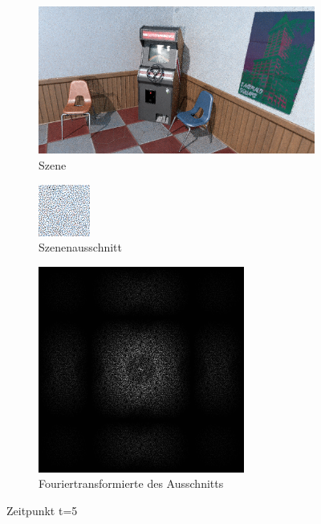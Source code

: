 \begin{figure}[H]
    \begin{subfigure}{\textwidth}   
        \centering \includegraphics[scale=.25]{content/TemporalerAlg/Bilder/Retargeting/Screenshots/seed_debug_7.0_selection.png}
        \caption{Szene}
        \label{fig:Retargeting_And_Sorting_Szene_t5}
    \end{subfigure}
    \begin{subfigure}{0.5\textwidth}
        \centering\includegraphics[width=0.4\linewidth]{content/TemporalerAlg/Bilder/Retargeting/Screenshots/seed_debug_7.0_ausschnitt.png} 
        \caption{Szenenausschnitt}
        \label{fig:Retargeting_And_Sorting_ausschnitt_t5}
    \end{subfigure}
    \begin{subfigure}{0.5\textwidth}
        \centering\includegraphics[width=0.4\linewidth]{content/TemporalerAlg/Bilder/Retargeting/Screenshots/Spektren/seed_debug_7.0_ausschnitt.png}
        \caption{Fouriertransformierte des Ausschnitts}
        \label{fig:Retargeting_And_Sorting_Fouriertransformierte_t5}
    \end{subfigure}
        \caption{Zeitpunkt t=5}
        \label{fig:Retargeting_And_Sorting_Verlauf_t5}
\end{figure}

